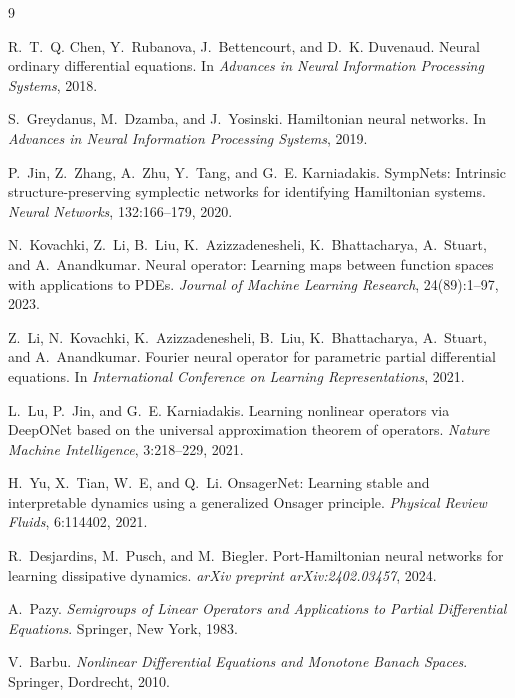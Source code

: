 \documentclass[hidelinks,review,nohypdvips,onefignum,onetabnum]{siamart220329}
\begin{document}
\begin{thebibliography}{9}

R.~T.~Q. Chen, Y.~Rubanova, J.~Bettencourt, and D.~K. Duvenaud.
Neural ordinary differential equations.
In \emph{Advances in Neural Information Processing Systems}, 2018.

S.~Greydanus, M.~Dzamba, and J.~Yosinski.
Hamiltonian neural networks.
In \emph{Advances in Neural Information Processing Systems}, 2019.

P.~Jin, Z.~Zhang, A.~Zhu, Y.~Tang, and G.~E. Karniadakis.
SympNets: Intrinsic structure-preserving symplectic networks for identifying Hamiltonian systems.
\emph{Neural Networks}, 132:166--179, 2020.

N.~Kovachki, Z.~Li, B.~Liu, K.~Azizzadenesheli, K.~Bhattacharya, A.~Stuart, and A.~Anandkumar.
Neural operator: Learning maps between function spaces with applications to PDEs.
\emph{Journal of Machine Learning Research}, 24(89):1--97, 2023.

Z.~Li, N.~Kovachki, K.~Azizzadenesheli, B.~Liu, K.~Bhattacharya, A.~Stuart, and A.~Anandkumar.
Fourier neural operator for parametric partial differential equations.
In \emph{International Conference on Learning Representations}, 2021.

L.~Lu, P.~Jin, and G.~E. Karniadakis.
Learning nonlinear operators via DeepONet based on the universal approximation theorem of operators.
\emph{Nature Machine Intelligence}, 3:218--229, 2021.

H.~Yu, X.~Tian, W.~E, and Q.~Li.
OnsagerNet: Learning stable and interpretable dynamics using a generalized Onsager principle.
\emph{Physical Review Fluids}, 6:114402, 2021.

R.~Desjardins, M.~Pusch, and M.~Biegler.
Port-Hamiltonian neural networks for learning dissipative dynamics.
\emph{arXiv preprint arXiv:2402.03457}, 2024.

A.~Pazy.
\emph{Semigroups of Linear Operators and Applications to Partial Differential Equations}.
Springer, New York, 1983.

V.~Barbu.
\emph{Nonlinear Differential Equations and Monotone Banach Spaces}.
Springer, Dordrecht, 2010.


\end{thebibliography}
\end{document}

